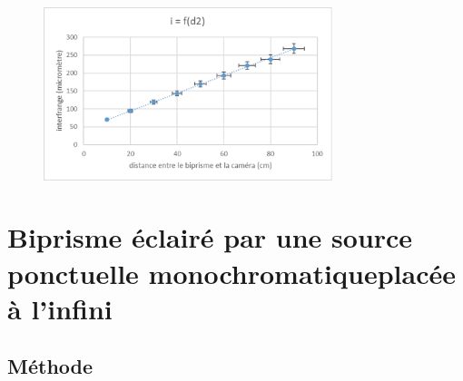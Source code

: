 \documentclass[11pt, a4paper]{article}
\begin{document}
    \begin{figure}[htbp] %
        \centering %
        \includegraphics[width=0.75\textwidth]{courbe1} %
        \label{courbe1}%
    \end{figure}






\section{Biprisme éclairé par une source ponctuelle monochromatiqueplacée à l’infini}
\subsection{Méthode}
\end{document}
